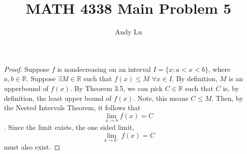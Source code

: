 \documentclass{article}
\title{MATH 4338 Main Problem 5}
\date{}
\author{Andy Lu}
\begin{document}
  \maketitle
  \begin{proof}
    Suppose $f$ is nondecreasing on an interval $I = \{x: a< x< b\}$, where
    $a,b \in \mathbb{R}$. Suppose $\exists M \in \mathbb{R}$ such that 
    $f(x) \leq M$ $\forall x \in I$. By definition, $M$ is an upperbound of 
    $f(x)$. By Theorem 3.5, we can pick $C \in \mathbb{R}$ such that $C$ is, by
    definition, the least upper bound of $f(x)$. Note, this means $C \leq M$. 
    Then, by the Nested Intervals Theorem, it follows that 
    $$\lim_{x \rightarrow b} f(x) = C$$. Since the limit exists, the one sided
    limit,
    $$\lim_{x \rightarrow b^-} f(x) = C$$
    must also exist.
  \end{proof}
\end{document}
